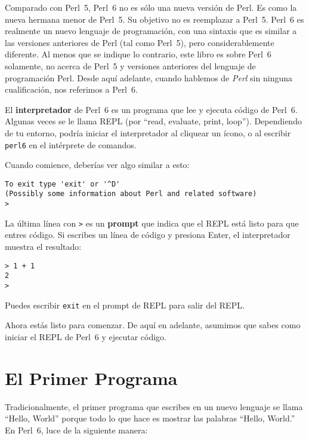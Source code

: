 Comparado con Perl~5, Perl~6 no es sólo una nueva versión de Perl.
Es como la nueva hermana menor de Perl~5. Su objetivo no es reemplazar
a Perl~5. Perl~6 es realmente un nuevo lenguaje de programación, con una sintaxis
que es similar a las versiones anteriores de Perl (tal como Perl~5), pero considerablemente
diferente. Al menos que se indique lo contrario, este libro es sobre Perl~6 solamente, no
acerca de Perl~5 y versiones anteriores del lenguaje de programación Perl. Desde aquí adelante,
cuando hablemos de \emph{Perl} sin ninguna cualificación, nos referimos a Perl~6.


El {\bf interpretador} de Perl~6 es un programa que lee y  
ejecuta código de Perl~6. Algunas veces se le llama REPL (por ``read, 
evaluate, print, loop''). Dependiendo de tu entorno, 
podría iniciar el interpretador al cliquear un ícono, o al 
escribir {\tt perl6} en el intérprete de comandos.

Cuando comience, deberías ver algo similar a esto:

\begin{verbatim}
To exit type 'exit' or '^D'
(Possibly some information about Perl and related software)
> 
\end{verbatim}
%

La última línea con {\tt >} es un {\bf prompt} que indica 
que el REPL está listo para que entres código. Si escribes un 
línea de código y presiona Enter, el interpretador muestra el resultado: 

\begin{verbatim}
> 1 + 1
2
>
\end{verbatim}
%
Puedes escribir {\tt exit} en el prompt de REPL para salir del REPL.

Ahora estás listo para comenzar.
De aquí en adelante, asumimos que sabes como iniciar el REPL de Perl~6 y 
ejecutar código.


\section{El Primer Programa}
\label{hello}

Tradicionalmente, el primer programa que escribes en un nuevo lenguaje
se llama ``Hello, World'' porque todo lo que hace es mostrar las palabras
``Hello, World.''  En Perl~6, luce de la siguiente manera:

